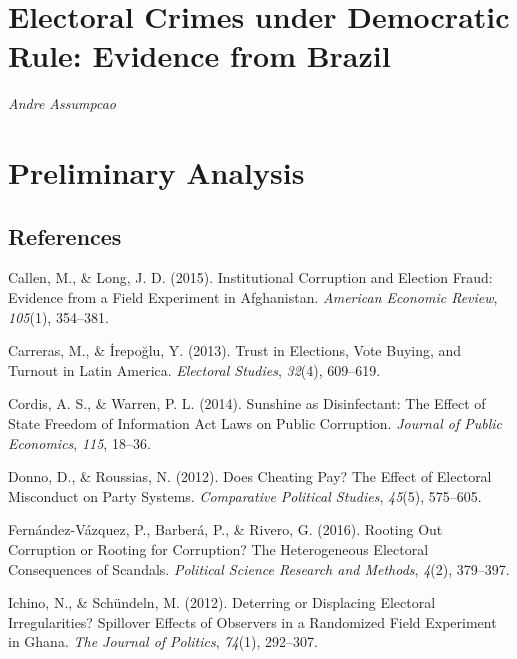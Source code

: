 \documentclass[]{article}
\title{}
\author{}
\date{}
\begin{document}
\hypertarget{title1}{%
\section{Electoral Crimes under Democratic Rule: Evidence from
Brazil}\label{title1}}

\emph{Andre Assumpcao}

\hypertarget{preliminary-analysis}{%
\section{Preliminary Analysis}\label{preliminary-analysis}}



\hypertarget{references}{%
\subsection*{References}\label{references}}

\hypertarget{refs}{}
\leavevmode\hypertarget{ref-CallenInstitutionalCorruptionElection2015}{}%
Callen, M., \& Long, J. D. (2015). Institutional Corruption and Election
Fraud: Evidence from a Field Experiment in Afghanistan. \emph{American
Economic Review}, \emph{105}(1), 354--381.

\leavevmode\hypertarget{ref-CarrerasTrustElectionsVote2013}{}%
Carreras, M., \& İrepoğlu, Y. (2013). Trust in Elections, Vote Buying,
and Turnout in Latin America. \emph{Electoral Studies}, \emph{32}(4),
609--619.

\leavevmode\hypertarget{ref-CordisSunshineDisinfectantEffect2014}{}%
Cordis, A. S., \& Warren, P. L. (2014). Sunshine as Disinfectant: The
Effect of State Freedom of Information Act Laws on Public Corruption.
\emph{Journal of Public Economics}, \emph{115}, 18--36.

\leavevmode\hypertarget{ref-DonnoDoesCheatingPay2012}{}%
Donno, D., \& Roussias, N. (2012). Does Cheating Pay? The Effect of
Electoral Misconduct on Party Systems. \emph{Comparative Political
Studies}, \emph{45}(5), 575--605.

\leavevmode\hypertarget{ref-Fernandez-VazquezRootingOutCorruption2016}{}%
Fernández-Vázquez, P., Barberá, P., \& Rivero, G. (2016). Rooting Out
Corruption or Rooting for Corruption? The Heterogeneous Electoral
Consequences of Scandals. \emph{Political Science Research and Methods},
\emph{4}(2), 379--397.

\leavevmode\hypertarget{ref-IchinoDeterringDisplacingElectoral2012}{}%
Ichino, N., \& Schündeln, M. (2012). Deterring or Displacing Electoral
Irregularities? Spillover Effects of Observers in a Randomized Field
Experiment in Ghana. \emph{The Journal of Politics}, \emph{74}(1),
292--307.
\end{document}
